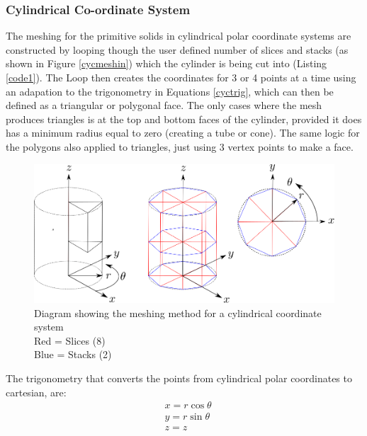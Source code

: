 \documentclass[12pt,a4paper]{article}
\begin{document}
\subsubsection{Cylindrical Co-ordinate System}
\label{cycl}
The meshing for the primitive solids in cylindrical polar coordinate systems are constructed by looping though the user defined number of slices and stacks (as shown in Figure \ref{cycmeshin}) which the cylinder is being cut into (Listing \ref{code1}). The Loop then creates the coordinates for 3 or 4 points at a time using an adapation to the trigonometry in Equations \ref{cyctrig}, which can then be defined as a triangular or polygonal face. The only cases where the mesh produces triangles is at the top and bottom faces of the cylinder, provided it does has a minimum radius equal to zero (creating a tube or cone). The same logic for the polygons also applied to triangles, just using 3 vertex points to make a face.

\begin{figure}[h!]
\centering
\includegraphics[scale=0.45]{Images//Coords//cyl.png}
\caption[width=\columnwidth]{Diagram showing the meshing method for a cylindrical coordinate system\\
Red = Slices   (8)\\
Blue = Stacks (2)}
\label{cylmeshin}
\end{figure}
\vspace{0.3cm}
The trigonometry that converts the points from cylindrical polar coordinates to cartesian, are:
\begin{equation}
\begin{aligned}
\label{cyctrig}
& x = r \cos{\theta} \\
& y = r \sin{\theta} \\
& z = z
\end{aligned}
\end{equation}
\end{document}
